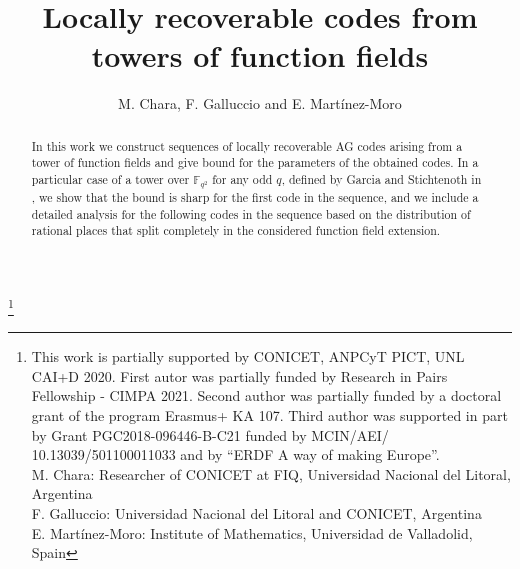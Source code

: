 \documentclass{amsart}
\newcommand{\F}{\mathbb{F}}
\theoremstyle{definition}
\begin{document}
\title{Locally recoverable codes from towers of function fields} %

\author{M. Chara, F. Galluccio and E. Martínez-Moro}
%

%




\thanks{This work is partially supported by CONICET, ANPCyT PICT, UNL CAI+D 2020. First autor was partially funded by Research in Pairs Fellowship - CIMPA 2021. Second author was partially funded by a doctoral grant of the program Erasmus+ KA 107. Third author was supported in part by Grant PGC2018-096446-B-C21 funded by MCIN/AEI/
	10.13039/501100011033 and by “ERDF A way of making Europe”.\\
M. Chara: Researcher of CONICET at FIQ, Universidad Nacional del Litoral, Argentina\\
F. Galluccio: Universidad Nacional del Litoral and CONICET, Argentina\\
E. Martínez-Moro: Institute of Mathematics, Universidad de Valladolid, Spain}



\begin{abstract}

In this work we construct sequences of locally recoverable AG codes arising from a tower of function fields and give bound for the parameters of the obtained codes. In a particular case of a tower over $\F_{q^2}$ for any odd $q$, defined by Garcia and Stichtenoth in \cite{GS}, we show that the bound is sharp for the first code in the sequence, and we include a detailed analysis for the following codes in the sequence based on the distribution of rational places that split completely in the considered function field extension.

\bigskip
{}

\bigskip
{}
\end{abstract}
\maketitle
\end{document}
